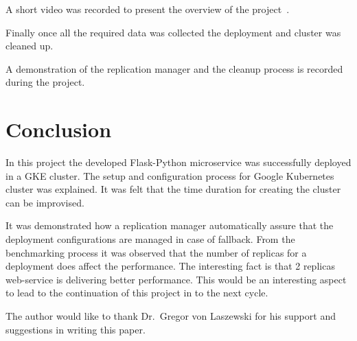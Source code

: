 A short video was recorded to present the overview of the
project~\cite{hid-sp18-417-project_overview}.

Finally once all the required data was collected the deployment and cluster
was cleaned up.

A demonstration of the replication manager and the cleanup process is
  recorded~\cite{hid-sp18-417-google_cleanup} during the project.
\section{Conclusion}


In this project the developed Flask-Python microservice was successfully
deployed in a GKE cluster. The setup and configuration process for Google
Kubernetes cluster was explained. It was felt that the time duration for
creating the cluster can be improvised.

It was demonstrated how a replication manager automatically assure that the
deployment configurations are managed in case of fallback. From the
benchmarking process it was observed that the number of replicas for a
deployment does affect the performance. The interesting fact is that 2
replicas web-service is delivering better performance. This would be an
interesting aspect to lead to the continuation of this project in to the next
cycle. 


\begin{acks}
The author would like to thank Dr.\ Gregor von Laszewski for his support and
suggestions in writing this paper.
\end{acks}






